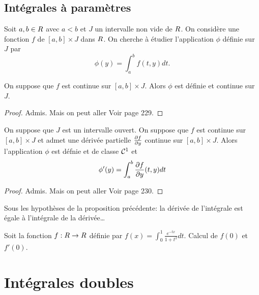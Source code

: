 \sld{\vfill\pagebreak[5]}%
\subsection{Intégrales à paramètres}

Soit $a,b \in R$ avec $a<b$ et $J$ un intervalle non vide de $R$. On considère une fonction $f$ de $[a,b] \times J$ dans $R$. On cherche à étudier l'application $\phi$ définie sur $J$ par 
\[
\phi(y) = \int_a^b f(t,y) dt.
\]

\begin{proposition}
	On suppose que $f$ est continue sur $[a,b] \times J $. Alors $\phi$ est définie et continue sur $J$.
\end{proposition}

\begin{proof}
Admis. Mais on peut aller Voir \cite{LM} page 229.
\end{proof}

\begin{proposition}
	On suppose que $J$ est un intervalle ouvert. On suppose que $f$ est continue sur $[a,b] \times J$ et admet une dérivée partielle $\frac{\partial f}{\partial y}$ continue sur $[a,b] \times J $. Alors l'application $\phi$ est défnie et de classe $\mathcal{C}^1$ et 
	\[
\phi'(y) = \int_a^b \frac{\partial f}{\partial y}(t,y) dt
	\]
\end{proposition}

\begin{proof}
	Admis. Mais on peut aller Voir \cite{LM} page 230.
\end{proof}

\begin{remark}
	Sous les hypothèses de la proposition précédente: la dérivée de l'intégrale est égale à l'intégrale de la dérivée\ldots
\end{remark}

\begin{exemple}
	Soit la fonction $f: R \to R$ définie par $f(x) = \int_0^1 \frac{e^{-tx}}{1+t^2} dt$. Calcul de $f(0)$ et $f'(0)$. %
	\pl{\rep{10cm}}
\end{exemple}

\sld{\vfill\pagebreak[5]}%
\section{Intégrales doubles}

